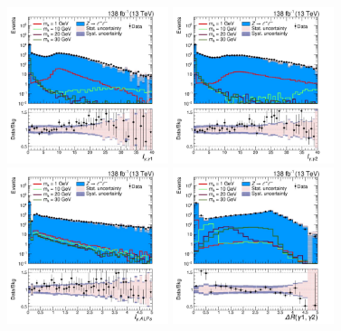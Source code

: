 \begin{figure}[htbp]
  \begin{center}
		\includegraphics[width=0.42\textwidth]{figures/chapter04/BDT_input/pho1PIso_noCorr_log.pdf}
        \includegraphics[width=0.42\textwidth]{figures/chapter04/BDT_input/pho2PIso_noCorr_log.pdf} \\
		\includegraphics[width=0.42\textwidth]{figures/chapter04/BDT_input/ALP_calculatedPhotonIso_log.pdf}
		\includegraphics[width=0.42\textwidth]{figures/chapter04/BDT_input/var_dR_g1g2_log.pdf}\\

\end{center}
\end{figure}
